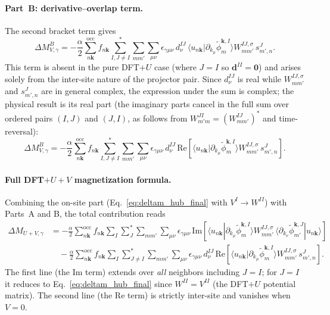 \documentclass[11pt]{article}
\begin{document}
\paragraph{Part~B: derivative--overlap term.}
The second bracket term gives
\begin{equation}
  \Delta M_{V,\gamma}^{B}
  =
  -\frac{\alpha}{2}
  \sum_{n\mathbf{k}}^{\mathrm{occ}}f_{n\mathbf{k}}
  \sum_{I,J\ne I}^{*}\sum_{mm'}\sum_{\mu\nu}
  \epsilon_{\gamma\mu\nu}\,d^{IJ}_\nu\,
  \langle u_{n\mathbf{k}}|\partial_{k_\mu}\widetilde\phi^{\mathbf{k},I}_{m}\rangle
  W_{mm'}^{IJ,\sigma}\,
  s^{J}_{m',n}.
  \label{eq:deltaM_VB}
\end{equation}
This term is absent in the pure DFT$+U$ case (where $J=I$ so
$\mathbf{d}^{II}=\mathbf{0}$) and arises solely from the inter-site
nature of the projector pair. Since $d^{IJ}_\nu$ is real while
$W_{mm'}^{IJ,\sigma}$ and $s^J_{m',n}$ are in general complex, the
expression under the sum is complex; the physical result is its real
part (the imaginary parts cancel in the full sum over ordered pairs
$(I,J)$ and $(J,I)$, as follows from $W^{JI}_{m'm} = (W^{IJ}_{mm'})^*$
and time-reversal):
\begin{equation}
  \Delta M_{V,\gamma}^{B}
  =
  -\frac{\alpha}{2}
  \sum_{n\mathbf{k}}^{\mathrm{occ}}f_{n\mathbf{k}}
  \sum_{I,J\ne I}^{*}\sum_{mm'}\sum_{\mu\nu}
  \epsilon_{\gamma\mu\nu}\,d^{IJ}_\nu\,
  \mathrm{Re}\!\left[
    \langle u_{n\mathbf{k}}|\partial_{k_\mu}\widetilde\phi^{\mathbf{k},I}_{m}\rangle
    W_{mm'}^{IJ,\sigma}\,
    s^{J}_{m',n}
  \right].
  \label{eq:deltaM_VB_re}
\end{equation}

\paragraph{Full DFT$+U+V$ magnetization formula.}
Combining the on-site part (Eq.~\eqref{eq:deltam_hub_final} with
$V^I\to W^{II}$) with Parts~A and B, the total contribution reads
\begin{align}
  \Delta M_{U+V,\gamma}
  &=
  -\frac{\alpha}{2}
  \sum_{n\mathbf{k}}^{\mathrm{occ}}f_{n\mathbf{k}}
  \sum_{I}\sum_{J}^{*}\sum_{mm'}\sum_{\mu\nu}
  \epsilon_{\gamma\mu\nu}\,
  \mathrm{Im}\!\left[
    \langle u_{n\mathbf{k}}|\partial_{k_\mu}\widetilde\phi^{\mathbf{k},I}_{m}\rangle
    W_{mm'}^{IJ,\sigma}\,
    \langle\partial_{k_\nu}\widetilde\phi^{\mathbf{k},J}_{m'}|u_{n\mathbf{k}}\rangle
  \right]
  \nonumber\\
  &\quad
  -\frac{\alpha}{2}
  \sum_{n\mathbf{k}}^{\mathrm{occ}}f_{n\mathbf{k}}
  \sum_{I}\sum_{J\ne I}^{*}\sum_{mm'}\sum_{\mu\nu}
  \epsilon_{\gamma\mu\nu}\,d^{IJ}_\nu\,
  \mathrm{Re}\!\left[
    \langle u_{n\mathbf{k}}|\partial_{k_\mu}\widetilde\phi^{\mathbf{k},I}_{m}\rangle
    W_{mm'}^{IJ,\sigma}\,
    s^{J}_{m',n}
  \right].
  \label{eq:deltam_uv_final}
\end{align}
The first line (the Im term) extends over \emph{all} neighbors including
$J=I$; for $J=I$ it reduces to Eq.~\eqref{eq:deltam_hub_final} since
$W^{II}=V^{II}$ (the DFT$+U$ potential matrix).  The second line
(the Re term) is strictly inter-site and vanishes when $V=0$.
\end{document}
